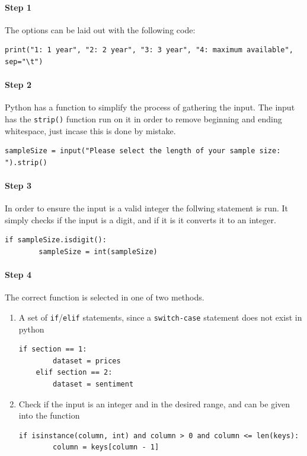\paragraph{Step 1}

The options can be laid out with the following code:
\begin{lstlisting}[caption=Menu Options]
print("1: 1 year", "2: 2 year", "3: 3 year", "4: maximum available", sep="\t")
\end{lstlisting}

\paragraph{Step 2}

Python has a function to simplify the process of gathering the input. The input has the \verb|strip()| function run on it in order to remove beginning and ending whitespace, just incase this is done by mistake.
\begin{lstlisting}[caption=Get Input]
sampleSize = input("Please select the length of your sample size: ").strip()
\end{lstlisting}

\paragraph{Step 3}

In order to ensure the input is a valid integer the follwing statement is run. It simply checks if the input is a digit, and if it is it converts it to an integer.
\begin{lstlisting}[caption=Check if Integer]
if sampleSize.isdigit():
        sampleSize = int(sampleSize)
\end{lstlisting}

\paragraph{Step 4}

The correct function is selected in one of two methods.
\begin{enumerate}
    \item A set of \verb|if|/\verb|elif| statements, since a \verb|switch-case| statement does not exist in python
    \begin{lstlisting}[caption=If/Elif Statements]
    if section == 1:
        dataset = prices
    elif section == 2:
        dataset = sentiment
    \end{lstlisting}
    \item Check if the input is an integer and in the desired range, and can be given into the function
    \begin{lstlisting}[caption=Integer Range Choice]
    if isinstance(column, int) and column > 0 and column <= len(keys):
        column = keys[column - 1]
    \end{lstlisting}
\end{enumerate}

